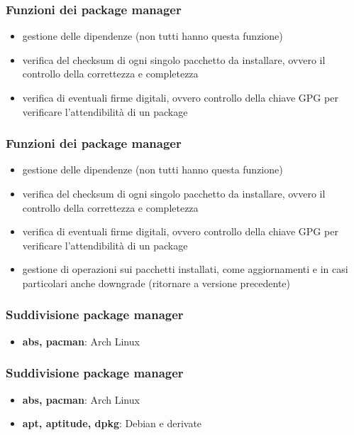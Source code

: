 \documentclass{beamer}
\begin{document}

\begin{frame}
	\frametitle{Funzioni dei package manager}
	\begin{itemize}
		\item gestione delle dipendenze (non tutti hanno questa funzione)
		\item verifica del checksum di ogni singolo pacchetto da installare, ovvero il controllo della correttezza e completezza
		\item verifica di eventuali firme digitali, ovvero controllo della chiave GPG per verificare l'attendibilit\`a di un package
	\end{itemize}
\end{frame}


\begin{frame}
	\frametitle{Funzioni dei package manager}
	\begin{itemize}
		\item gestione delle dipendenze (non tutti hanno questa funzione)
		\item verifica del checksum di ogni singolo pacchetto da installare, ovvero il controllo della correttezza e completezza
		\item verifica di eventuali firme digitali, ovvero controllo della chiave GPG per verificare l'attendibilit\`a di un package
		\item gestione di operazioni sui pacchetti installati, come aggiornamenti e in casi particolari anche downgrade (ritornare a versione precedente)
	\end{itemize}
\end{frame}


\begin{frame}
\frametitle{Suddivisione package manager}
\begin{itemize}
\item \textbf{abs, pacman}: Arch Linux 
\end{itemize}
\end{frame}


\begin{frame}
	\frametitle{Suddivisione package manager}
	\begin{itemize}
		\item \textbf{abs, pacman}: Arch Linux
		\item \textbf{apt, aptitude, dpkg}: Debian e derivate
	\end{itemize}
\end{frame}
\end{document}
